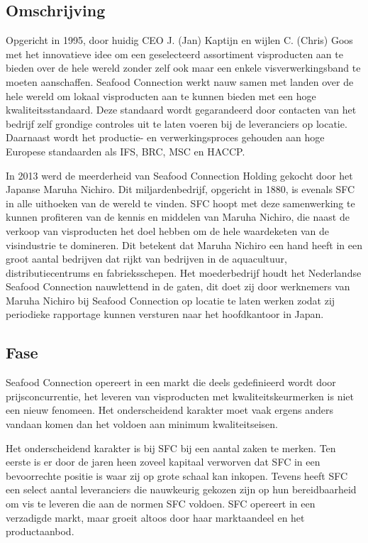 \documentclass[10pt,a4paper,twoside]{report}
\begin{document}
\subsection{Omschrijving}
Opgericht in 1995, door huidig CEO J. (Jan) Kaptijn en wijlen C. (Chris) Goos met het innovatieve idee om een geselecteerd assortiment visproducten aan te bieden over de hele wereld zonder zelf ook maar een enkele visverwerkingsband te moeten aanschaffen. Seafood Connection werkt nauw samen met landen over de hele wereld om lokaal visproducten aan te kunnen bieden met een hoge kwaliteitsstandaard. Deze standaard wordt gegarandeerd door contacten van het bedrijf zelf grondige controles uit te laten voeren bij de leveranciers op locatie. Daarnaast wordt het productie- en verwerkingsproces gehouden aan hoge Europese standaarden als IFS, BRC, MSC en HACCP. \citep{sfcwebsite}

In 2013 werd de meerderheid van Seafood Connection Holding gekocht door het Japanse Maruha Nichiro. Dit miljardenbedrijf, opgericht in 1880, is evenals SFC in alle uithoeken van de wereld te vinden. SFC hoopt met deze samenwerking te kunnen profiteren van de kennis en middelen van Maruha Nichiro, die naast de verkoop van visproducten het doel hebben om de hele waardeketen van de visindustrie te domineren. Dit betekent dat Maruha Nichiro een hand heeft in een groot aantal bedrijven dat rijkt van bedrijven in de aquacultuur, distributiecentrums en fabrieksschepen. Het moederbedrijf houdt het Nederlandse Seafood Connection nauwlettend in de gaten, dit doet zij door werknemers van Maruha Nichiro bij Seafood Connection op locatie te laten werken zodat zij periodieke rapportage kunnen versturen naar het hoofdkantoor in Japan. \citep{sfcwebsite,Visserijnieuws}

\subsection{Fase}
Seafood Connection opereert in een markt die deels gedefinieerd wordt door prijsconcurrentie, het leveren van visproducten met kwaliteitskeurmerken is niet een nieuw fenomeen. Het onderscheidend karakter moet vaak ergens anders vandaan komen dan het voldoen aan minimum kwaliteitseisen. 

Het onderscheidend karakter is bij SFC bij een aantal zaken te merken. Ten eerste is er door de jaren heen zoveel kapitaal verworven dat SFC in een bevoorrechte positie is waar zij op grote schaal kan inkopen. Tevens heeft SFC een select aantal leveranciers die nauwkeurig gekozen zijn op hun bereidbaarheid om vis te leveren die aan de normen SFC voldoen. SFC opereert in een verzadigde markt, maar groeit altoos door haar marktaandeel en het productaanbod.
\end{document}
